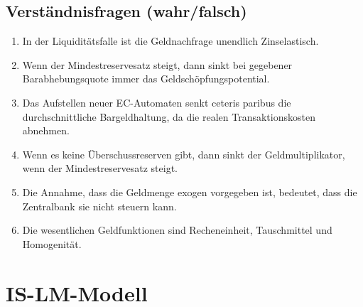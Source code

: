 \documentclass{scrartcl}
\begin{document}
\subsection{Verst\"{a}ndnisfragen (wahr/falsch)}
\begin{enumerate}
  \item In der Liquidit\"{a}tsfalle ist die Geldnachfrage unendlich Zinselastisch. %
  \item Wenn der Mindestreservesatz steigt, dann sinkt bei gegebener Barabhebungsquote
immer das Geldsch\"{o}pfungspotential. %
\item Das Aufstellen neuer EC-Automaten senkt ceteris paribus die durchschnittliche
Bargeldhaltung, da die realen Transaktionskosten abnehmen. %
\item Wenn es keine \"{U}berschussreserven gibt, dann sinkt der Geldmultiplikator, wenn
der Mindestreservesatz steigt. %
\item Die Annahme, dass die Geldmenge exogen vorgegeben ist, bedeutet, dass die Zentralbank
sie nicht steuern kann. %
\item Die wesentlichen Geldfunktionen sind Recheneinheit, Tauschmittel und Homogenit\"{a}t. %
\end{enumerate}

\section{IS-LM-Modell}
\end{document}
